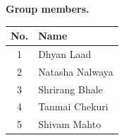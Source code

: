 \noindent\textbf{Group members.}\par
\begin{center}
\renewcommand{\arraystretch}{1.25}
\begin{tabular}{|c|p{5cm}|}
\hline
\textbf{No.} & \textbf{Name} \\ \hline
1 & Dhyan Laad \\ \hline
2 & Natasha Nalwaya \\ \hline
3 & Shrirang Bhale \\ \hline
4 & Tanmai Chekuri \\ \hline
5 & Shivam Mahto \\ \hline
\end{tabular}
\end{center}

